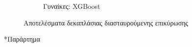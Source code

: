 \documentclass[12pt]{report}
\makeatletter
\let\oldchapter\chapter
\renewcommand{\chapter}{\@ifstar{\starchapter}{\nostarchapter}}
\newcommand{\starchapter}[1]{\oldchapter*{#1}\thispagestyle{mainstyle}}
\newcommand{\nostarchapter}[1]{\oldchapter{#1}\thispagestyle{mainstyle}}
\makeatother
\begin{document}
\begin{figure}[ht]
\begin{subfigure}[b]{0.48\textwidth}
                        \caption{Γυναίκες: XGBoost}
                        \label{stratified_Male_50-70_XGBOOST_useSMOTE_False_k_fold_validation}
                    \end{subfigure}
                    \vspace{-0.5cm}
                    \caption{Αποτελέσματα δεκαπλάσιας διασταυρούμενης επικύρωσης}
                    \label{fig:ml-algorithms-k-fold-validation}               
                \end{figure}
            \par
    \newpage

    \cleardoublepage
    \appendix
    \chapter*{Παράρτημα}
    
\end{document}
